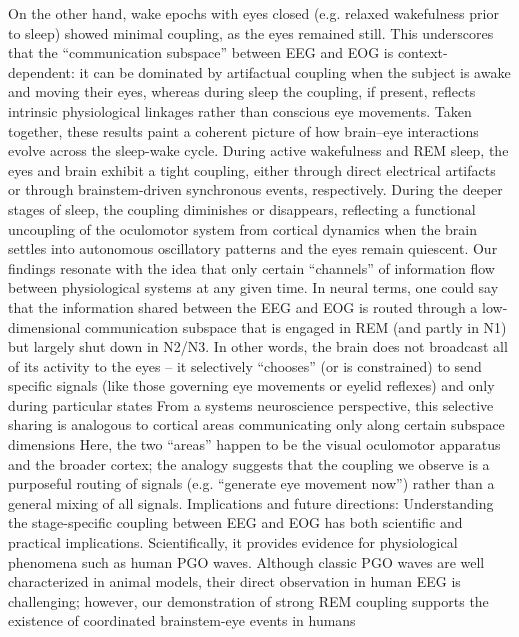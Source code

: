 On the other hand, wake epochs with eyes closed (e.g. relaxed wakefulness prior to sleep) showed minimal coupling, as the eyes remained still. This underscores that the “communication subspace” between EEG and EOG is context-dependent: it can be dominated by artifactual coupling when the subject is awake and moving their eyes, whereas during sleep the coupling, if present, reflects intrinsic physiological linkages rather than conscious eye movements. Taken together, these results paint a coherent picture of how brain–eye interactions evolve across the sleep-wake cycle. During active wakefulness and REM sleep, the eyes and brain exhibit a tight coupling, either through direct electrical artifacts or through brainstem-driven synchronous events, respectively. During the deeper stages of sleep, the coupling diminishes or disappears, reflecting a functional uncoupling of the oculomotor system from cortical dynamics when the brain settles into autonomous oscillatory patterns and the eyes remain quiescent. Our findings resonate with the idea that only certain “channels” of information flow between physiological systems at any given time. In neural terms, one could say that the information shared between the EEG and EOG is routed through a low-dimensional communication subspace that is engaged in REM (and partly in N1) but largely shut down in N2/N3. In other words, the brain does not broadcast all of its activity to the eyes – it selectively “chooses” (or is constrained) to send specific signals (like those governing eye movements or eyelid reflexes) and only during particular states %
From a systems neuroscience perspective, this selective sharing is analogous to cortical areas communicating only along certain subspace dimensions %
Here, the two “areas” happen to be the visual oculomotor apparatus and the broader cortex; the analogy suggests that the coupling we observe is a purposeful routing of signals (e.g. “generate eye movement now”) rather than a general mixing of all signals. Implications and future directions: Understanding the stage-specific coupling between EEG and EOG has both scientific and practical implications. Scientifically, it provides evidence for physiological phenomena such as human PGO waves. Although classic PGO waves are well characterized in animal models, their direct observation in human EEG is challenging; however, our demonstration of strong REM coupling supports the existence of coordinated brainstem-eye events in humans %
